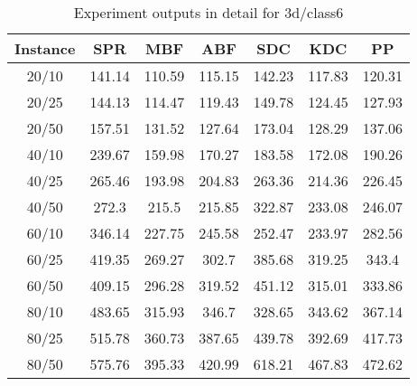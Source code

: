 \begin{table}[ht!]
    \caption{Experiment outputs in detail for 3d/class6}
    \centering
    \begin{tabular}{@{}ccccccc@{}}
        \toprule
        {\bfseries Instance} & {\bfseries SPR} & {\bfseries MBF}
        & {\bfseries ABF} & {\bfseries SDC} & {\bfseries KDC} & {\bfseries PP}\\
        \midrule
        20/10 & 141.14 & 110.59 & 115.15 & 142.23 & 117.83 & 120.31\\
        20/25 & 144.13 & 114.47 & 119.43 & 149.78 & 124.45 & 127.93\\
        20/50 & 157.51 & 131.52 & 127.64 & 173.04 & 128.29 & 137.06\\
        40/10 & 239.67 & 159.98 & 170.27 & 183.58 & 172.08 & 190.26\\
        40/25 & 265.46 & 193.98 & 204.83 & 263.36 & 214.36 & 226.45\\
        40/50 & 272.3 & 215.5 & 215.85 & 322.87 & 233.08 & 246.07\\
        60/10 & 346.14 & 227.75 & 245.58 & 252.47 & 233.97 & 282.56\\
        60/25 & 419.35 & 269.27 & 302.7 & 385.68 & 319.25 & 343.4\\
        60/50 & 409.15 & 296.28 & 319.52 & 451.12 & 315.01 & 333.86\\
        80/10 & 483.65 & 315.93 & 346.7 & 328.65 & 343.62 & 367.14\\
        80/25 & 515.78 & 360.73 & 387.65 & 439.78 & 392.69 & 417.73\\
        80/50 & 575.76 & 395.33 & 420.99 & 618.21 & 467.83 & 472.62\\
        \bottomrule
    \end{tabular}
\end{table}